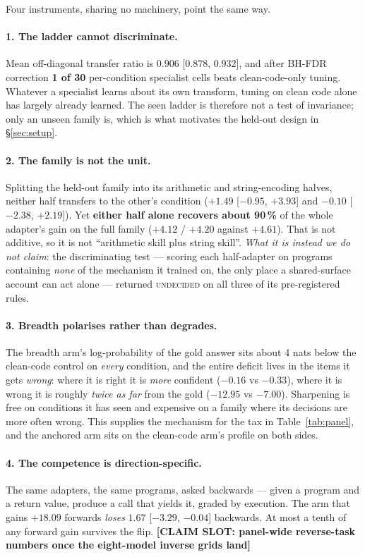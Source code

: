 \documentclass[sigconf,review,anonymous]{acmart}
\newcommand{\slot}[1]{\textbf{[CLAIM SLOT: #1]}}
\begin{document}
Four instruments, sharing no machinery, point the same way.

\paragraph{1. The ladder cannot discriminate.} Mean off-diagonal transfer ratio is $0.906$
[$0.878$, $0.932$], and after BH-FDR correction \textbf{1 of 30} per-condition specialist cells
beats clean-code-only tuning. Whatever a specialist learns about its own transform, tuning on clean
code alone has largely already learned. The seen ladder is therefore not a test of invariance; only
an unseen family is, which is what motivates the held-out design in \S\ref{sec:setup}.

\paragraph{2. The family is not the unit.} Splitting the held-out family into its arithmetic and
string-encoding halves, neither half transfers to the other's condition ($+1.49$ [$-0.95$, $+3.93$]
and $-0.10$ [$-2.38$, $+2.19$]). Yet \textbf{either half alone recovers about 90\,\%} of the whole
adapter's gain on the full family ($+4.12$ / $+4.20$ against $+4.61$). That is not additive, so it
is not ``arithmetic skill plus string skill''. \emph{What it is instead we do not claim}: the
discriminating test --- scoring each half-adapter on programs containing \emph{none} of the
mechanism it trained on, the only place a shared-surface account can act alone --- returned
\textsc{undecided} on all three of its pre-registered rules.

\paragraph{3. Breadth polarises rather than degrades.} The breadth arm's log-probability of the gold
answer sits about 4 nats below the clean-code control on \emph{every} condition, and the entire
deficit lives in the items it gets \emph{wrong}: where it is right it is \emph{more} confident
($-0.16$ vs $-0.33$), where it is wrong it is roughly \emph{twice as far} from the gold ($-12.95$
vs $-7.00$). Sharpening is free on conditions it has seen and expensive on a family where its
decisions are more often wrong. This supplies the mechanism for the tax in
Table~\ref{tab:panel}, and the anchored arm sits on the clean-code arm's profile on both sides.

\paragraph{4. The competence is direction-specific.} The same adapters, the same programs, asked
backwards --- given a program and a return value, produce a call that yields it, graded by
execution. The arm that gains $+18.09$ forwards \emph{loses} $1.67$ [$-3.29$, $-0.04$] backwards.
At most a tenth of any forward gain survives the flip. \slot{panel-wide reverse-task numbers once
the eight-model inverse grids land}
\end{document}
